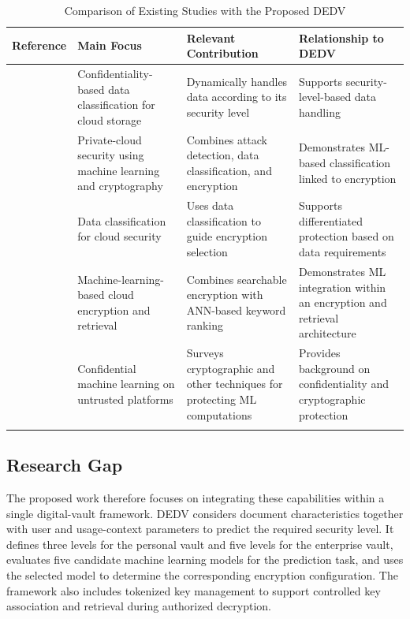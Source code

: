 \documentclass[pdflatex,sn-mathphys-num]{sn-jnl}
\begin{document}
\begin{table}[h]
\caption{Comparison of Existing Studies with the Proposed DEDV}\label{tab1}
\begin{tabular}{@{}cp{3cm}p{3.6cm}p{3.6cm}@{}}
\toprule
Reference & Main Focus & Relevant Contribution & Relationship to DEDV \\
\midrule
\cite{ali2023confidentiality} & Confidentiality-based data classification for cloud storage &
  Dynamically handles data according to its security level & Supports security-level-based data
  handling \\
\cite{jabbar2022secure} & Private-cloud security using machine learning and cryptography &
  Combines attack detection, data classification, and encryption & Demonstrates ML-based
  classification linked to encryption \\
\cite{singh2018classification} & Data classification for cloud security & Uses data
  classification to guide encryption selection & Supports differentiated protection based on
  data requirements \\
\cite{malhotra2023efficacy} & Machine-learning-based cloud encryption and retrieval & Combines
  searchable encryption with ANN-based keyword ranking & Demonstrates ML integration within an
  encryption and retrieval architecture \\
\cite{sagar2021confidential} & Confidential machine learning on untrusted platforms & Surveys
  cryptographic and other techniques for protecting ML computations & Provides background on
  confidentiality and cryptographic protection \\
\botrule
\end{tabular}
\end{table}

\subsection{Research Gap}

The proposed work therefore focuses on integrating these capabilities within a single
digital-vault framework. DEDV considers document characteristics together with user and
usage-context parameters to predict the required security level. It defines three levels for the
personal vault and five levels for the enterprise vault, evaluates five candidate machine learning
models for the prediction task, and uses the selected model to determine the corresponding
encryption configuration. The framework also includes tokenized key management to support
controlled key association and retrieval during authorized decryption.
\end{document}
